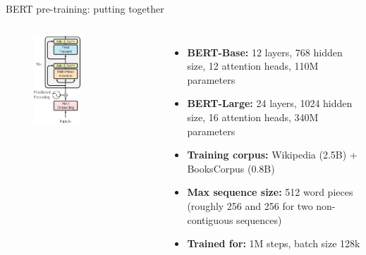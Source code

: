 \documentclass[serif, aspectratio=169]{beamer}
\begin{document}
\begin{frame}{BERT pre-training: putting together}
    \begin{columns}
        \begin{figure}[h]
            \centering
            \includegraphics[width=0.5\textwidth]{Figures/BERT.png}
        \end{figure}
        
        \begin{itemize}
            \item \textbf{BERT-Base:} 12 layers, 768 hidden size, 12 attention heads, 110M parameters
            \vspace{0.3cm}
            \item \textbf{BERT-Large:} 24 layers, 1024 hidden size, 16 attention heads, 340M parameters
            \vspace{0.3cm}
            \item \textbf{Training corpus:} Wikipedia (2.5B) + BooksCorpus (0.8B)
            \vspace{0.3cm}
            \item \textbf{Max sequence size:} 512 word pieces (roughly 256 and 256 for two non-contiguous sequences)
            \vspace{0.3cm}
            \item \textbf{Trained for:} 1M steps, batch size 128k
        \end{itemize}
    \end{columns}
\end{frame}
\end{document}
